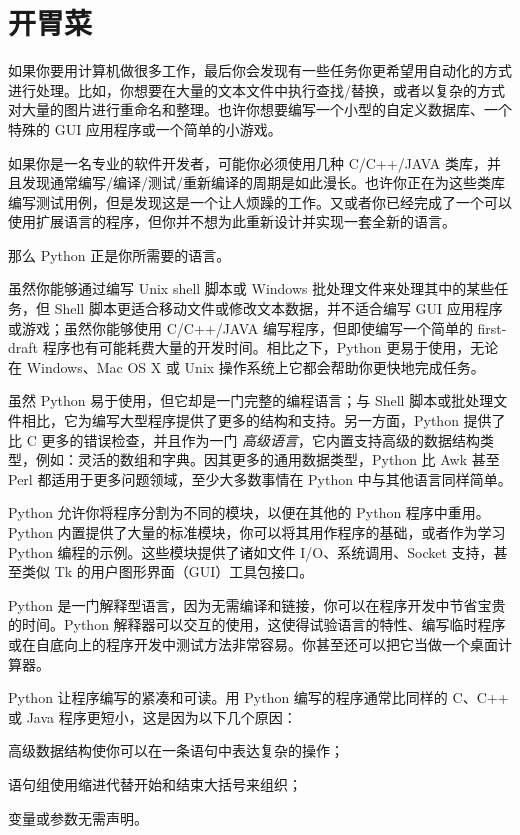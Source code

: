 \chapter{开胃菜\label{Appetite}}
如果你要用计算机做很多工作，最后你会发现有一些任务你更希望用自动化的方式进行处理。比如，你想要在大量的文本文件中执行查找/替换，或者以复杂的方式对大量的图片进行重命名和整理。也许你想要编写一个小型的自定义数据库、一个特殊的 GUI 应用程序或一个简单的小游戏。\

如果你是一名专业的软件开发者，可能你必须使用几种 C/C++/JAVA 类库，并且发现通常编写/编译/测试/重新编译的周期是如此漫长。也许你正在为这些类库编写测试用例，但是发现这是一个让人烦躁的工作。又或者你已经完成了一个可以使用扩展语言的程序，但你并不想为此重新设计并实现一套全新的语言。

那么 Python 正是你所需要的语言。

虽然你能够通过编写 Unix shell 脚本或 Windows 批处理文件来处理其中的某些任务，但 Shell 脚本更适合移动文件或修改文本数据，并不适合编写 GUI 应用程序或游戏；虽然你能够使用 C/C++/JAVA 编写程序，但即使编写一个简单的 first-draft 程序也有可能耗费大量的开发时间。相比之下，Python 更易于使用，无论在 Windows、Mac OS X 或 Unix 操作系统上它都会帮助你更快地完成任务。

虽然 Python 易于使用，但它却是一门完整的编程语言；与 Shell 脚本或批处理文件相比，它为编写大型程序提供了更多的结构和支持。另一方面，Python 提供了比 C 更多的错误检查，并且作为一门 \emph{高级语言}，它内置支持高级的数据结构类型，例如：灵活的数组和字典。因其更多的通用数据类型，Python 比 Awk 甚至 Perl 都适用于更多问题领域，至少大多数事情在 Python 中与其他语言同样简单。

Python 允许你将程序分割为不同的模块，以便在其他的 Python 程序中重用。Python 内置提供了大量的标准模块，你可以将其用作程序的基础，或者作为学习 Python 编程的示例。这些模块提供了诸如文件 I/O、系统调用、Socket 支持，甚至类似 Tk 的用户图形界面（GUI）工具包接口。

Python 是一门解释型语言，因为无需编译和链接，你可以在程序开发中节省宝贵的时间。Python 解释器可以交互的使用，这使得试验语言的特性、编写临时程序或在自底向上的程序开发中测试方法非常容易。你甚至还可以把它当做一个桌面计算器。

Python 让程序编写的紧凑和可读。用 Python 编写的程序通常比同样的 C、C++ 或 Java 程序更短小，这是因为以下几个原因：
\begin{compactitem}
  \item 高级数据结构使你可以在一条语句中表达复杂的操作；
  \item 语句组使用缩进代替开始和结束大括号来组织；
  \item 变量或参数无需声明。
\end{compactitem}

